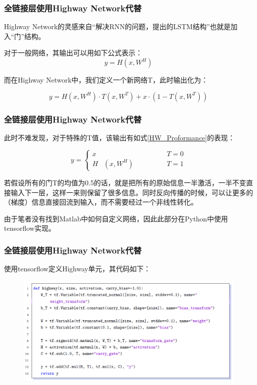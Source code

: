 \documentclass[aspectratio=169, 10pt, utf8, mathserif]{beamer}
\begin{document}
\begin{frame}
	\frametitle{全链接层使用Highway Network代替}
	Highway Network的灵感来自“解决RNN的问题，提出的LSTM结构”也就是加入“门”结构。
	
	对于一般网络，其输出可以用如下公式表示：
	\begin{equation}\label{normal}
		y=H(x,W^H)
	\end{equation}
	
	而在Highway Network中，我们定义一个新网络T，此时输出化为：
	
	\begin{equation}\label{HeightWay}
		y=H(x,W^H)\cdot T(x,W^T)+x\cdot (1-T(x,W^T))
	\end{equation}
\end{frame}	
\begin{frame}
	\frametitle{全链接层使用Highway Network代替}
	此时不难发现，对于特殊的T值，该输出有如式\ref{HW_Proformance}的表现：
	
	\begin{equation}\label{HW_Proformance}
		y=
		\left\{\begin{matrix} 
			x& &T=0\\  
			H&(x,W^H)\qquad\qquad&T=1
		\end{matrix}\right. 
	\end{equation}
	
	若假设所有的门T的均值为0.5的话，就是把所有的原始信息一半激活，一半不变直接输入下一层，这样一来则保留了很多信息。同时反向传播的时候，可以让更多的（梯度）信息直接回流到输入，而不需要经过一个非线性转化。
	
	由于笔者没有找到Matlab中如何自定义网络，因此此部分在Python中使用tensorflow实现。
\end{frame}	
\begin{frame}
	\frametitle{全链接层使用Highway Network代替}
	使用tensorflow定义Highway单元，其代码如下：
	\begin{figure}[H]
		\centering
		\includegraphics[width=0.7\linewidth]{pic/screenshot039}
		\label{fig:screenshot039}
	\end{figure}
	
\end{frame}	
\end{document}
